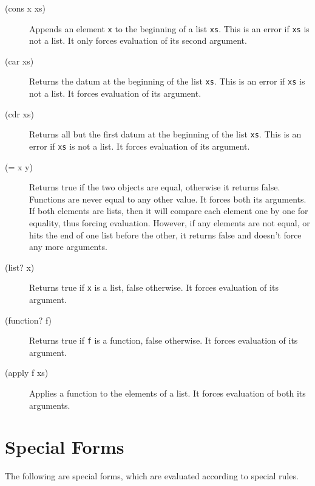 \documentclass[12pt]{article}
\begin{document}
\begin{description}
\item[(cons x xs)] Appends an element \verb!x! to the beginning of a list
  \verb!xs!. This is an error if \verb!xs! is not a list. It only forces
  evaluation of its second argument.

\item[(car xs)] Returns the datum at the beginning of the list \verb!xs!. This
  is an error if \verb!xs! is not a list. It forces evaluation of its argument.

\item[(cdr xs)] Returns all but the first datum at the beginning of the list
  \verb!xs!. This is an error if \verb!xs! is not a list. It forces evaluation
  of its argument.

\item[(= x y)] Returns true if the two objects are equal, otherwise it returns
  false. Functions are never equal to any other value. It forces both its
  arguments. If both elements are lists, then it will compare each element one
  by one for equality, thus forcing evaluation. However, if any elements are not
  equal, or hits the end of one list before the other, it returns false and
  doesn't force any more arguments.

\item[(list? x)] Returns true if \verb!x! is a list, false otherwise. It forces
  evaluation of its argument.

\item[(function? f)] Returns true if \verb!f! is a function, false otherwise. It
  forces evaluation of its argument.

\item[(apply f xs)] Applies a function to the elements of a list. It forces
  evaluation of both its arguments.
\end{description}

\section{Special Forms}

The following are special forms, which are evaluated according to special rules.
\end{document}
